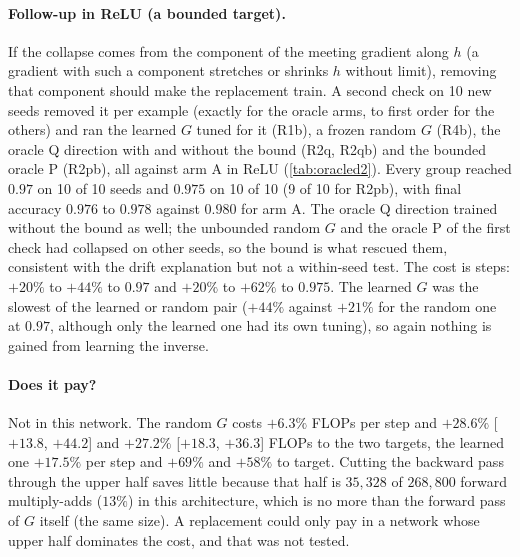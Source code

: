 \paragraph{Follow-up in ReLU (a bounded target).} If the collapse comes from the component of the meeting gradient along $h$ (a gradient with such a component stretches or shrinks $h$ without limit), removing that component should make the replacement train. A second check on 10 new seeds removed it per example (exactly for the oracle arms, to first order for the others) and ran the learned $G$ tuned for it (R1b), a frozen random $G$ (R4b), the oracle Q direction with and without the bound (R2q, R2qb) and the bounded oracle P (R2pb), all against arm A in ReLU (\cref{tab:oracled2}). Every group reached $0.97$ on 10 of 10 seeds and $0.975$ on 10 of 10 (9 of 10 for R2pb), with final accuracy $0.976$ to $0.978$ against $0.980$ for arm A. The oracle Q direction trained without the bound as well; the unbounded random $G$ and the oracle P of the first check had collapsed on other seeds, so the bound is what rescued them, consistent with the drift explanation but not a within-seed test. The cost is steps: $+20\%$ to $+44\%$ to $0.97$ and $+20\%$ to $+62\%$ to $0.975$. The learned $G$ was the slowest of the learned or random pair ($+44\%$ against $+21\%$ for the random one at $0.97$, although only the learned one had its own tuning), so again nothing is gained from learning the inverse.

\begin{table}[t]
\centering\small
\caption{Check 5 follow-up in ReLU: lower half trained by the meeting signal alone with the radial component of the meeting gradient removed (10 new seeds, reference arm A in ReLU, $95\%$ paired bootstrap). The FLOPs of the oracle groups include the exact Jacobian computation and are not reported (--); a miss is charged the full run.}
\label{tab:oracled2}
\end{table}

\paragraph{Does it pay?} Not in this network. The random $G$ costs $+6.3\%$ FLOPs per step and $+28.6\%$ [$+13.8$, $+44.2$] and $+27.2\%$ [$+18.3$, $+36.3$] FLOPs to the two targets, the learned one $+17.5\%$ per step and $+69\%$ and $+58\%$ to target. Cutting the backward pass through the upper half saves little because that half is $35{,}328$ of $268{,}800$ forward multiply-adds ($13\%$) in this architecture, which is no more than the forward pass of $G$ itself (the same size). A replacement could only pay in a network whose upper half dominates the cost, and that was not tested.


